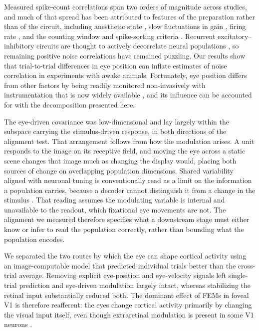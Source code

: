 \documentclass{lite}
\begin{document}
Measured spike-count correlations span two orders of magnitude across studies, and much of that spread has been attributed to features of the preparation rather than of the circuit, including anesthetic state \cite{ecker2014state}, slow fluctuations in gain \cite{goris2014partitioning}, firing rate \cite{delarocha2007correlation}, and the counting window and spike-sorting criteria \cite{cohen2011measuring}. Recurrent excitatory--inhibitory circuits are thought to actively decorrelate neural populations \cite{renart2010asynchronous}, so remaining positive noise correlations have remained puzzling. Our results show that trial-to-trial differences in eye position can inflate estimates of noise correlation in experiments with awake animals. Fortunately, eye position differs from other factors by being readily monitored non-invasively with instrumentation that is now widely available \cite{ressmeyer2025openirisdpi}, and its influence can be accounted for with the decomposition presented here.

The eye-driven covariance was low-dimensional and lay largely within the subspace carrying the stimulus-driven response, in both directions of the alignment test. That arrangement follows from how the modulation arises. A unit responds to the image on its receptive field, and moving the eye across a static scene changes that image much as changing the display would, placing both sources of change on overlapping population dimensions. Shared variability aligned with neuronal tuning is conventionally read as a limit on the information a population carries, because a decoder cannot distinguish it from a change in the stimulus \cite{moreno2014information, kohn2016correlations}. That reading assumes the modulating variable is internal and unavailable to the readout, which fixational eye movements are not. The alignment we measured therefore specifies what a downstream stage must either know or infer to read the population correctly, rather than bounding what the population encodes.

We separated the two routes by which the eye can shape cortical activity using an image-computable model that predicted individual trials better than the cross-trial average. Removing explicit eye-position and eye-velocity signals left single-trial prediction and eye-driven modulation largely intact, whereas stabilizing the retinal input substantially reduced both. The dominant effect of FEMs in foveal V1 is therefore reafferent: the eyes change cortical activity primarily by changing the visual input itself, even though extraretinal modulation is present in some V1 neurons \cite{snodderly2001selective,kagan2008saccades}.
\end{document}

